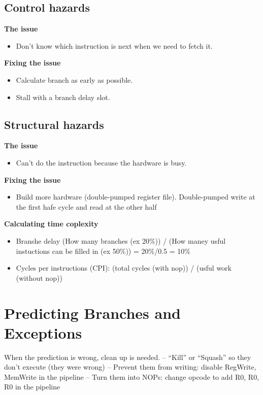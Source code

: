\documentclass{article}
\begin{document}
\subsection{Control hazards}
\textbf{The issue}
\begin{itemize}
\item  Don’t know which instruction is next when we need to fetch it.
\end{itemize}

\textbf{Fixing the issue}
\begin{itemize}
\item  Calculate branch as early as possible.
\item  Stall with a branch delay slot.
\end{itemize}


\subsection{Structural hazards}
\textbf{The issue}
\begin{itemize}
\item  Can’t do the instruction because the hardware is busy.  
\end{itemize}

\textbf{Fixing the issue}
\begin{itemize}
\item  Build more hardware (double-pumped register file).
  Double-pumped write at the first hafe cycle and read at the other half
\end{itemize}

\textbf{Calculating time coplexity}
\begin{itemize}
\item  Branshe delay \newline
  (How many branches (ex 20\%)) / (How maney usful instuctions can be filled in (ex 50\%))
  = 20\%/0.5 = 10\%
\item  Cycles per instructions (CPI): (total cycles (with nop)) / (usful work (without nop))
\end{itemize}


\newpage


\section{Predicting Branches and Exceptions}
When the prediction is wrong, clean up is needed.
– “Kill” or “Squash” so they don’t execute (they were wrong)
– Prevent them from writing: disable RegWrite, MemWrite in the pipeline
– Turn them into NOPs: change opcode to add R0, R0, R0 in the pipeline
\end{document}
